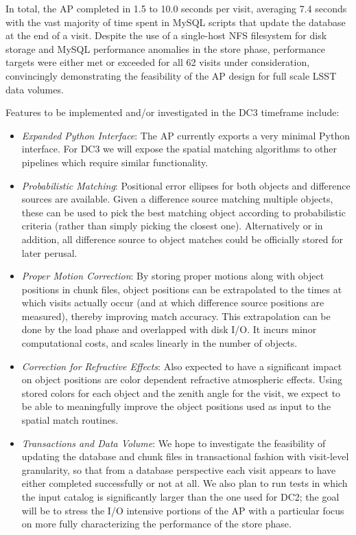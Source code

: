 In total, the AP completed in 1.5 to 10.0 seconds per visit, averaging 7.4
seconds with the vast majority of time spent in MySQL scripts that update the
database at the end of a visit. Despite the use of a single-host NFS
filesystem for disk storage and MySQL performance anomalies in the store
phase, performance targets were either met or exceeded for all 62 visits
under consideration, convincingly demonstrating the feasibility of the AP
design for full scale LSST data volumes.

Features to be implemented and/or investigated in the DC3 timeframe include:
\begin{itemize}
\item \emph{Expanded Python Interface}:
    The AP currently exports a very minimal Python interface. For DC3 we
    will expose the spatial matching algorithms to other pipelines which
    require similar functionality.
\item \emph{Probabilistic Matching}:
    Positional error ellipses for both objects and difference sources are
    available. Given a difference source matching multiple objects, these
    can be used to pick the best matching object according to probabilistic
    criteria (rather than simply picking the closest one). Alternatively
    or in addition, all difference source to object matches could be
    officially stored for later perusal.
\item \emph{Proper Motion Correction}:
    By storing proper motions along with object positions in chunk files,
    object positions can be extrapolated to the times at which visits actually
    occur (and at which difference source positions are measured), thereby
    improving match accuracy. This extrapolation can be done by the load phase
    and overlapped with disk I/O. It incurs minor computational costs, and scales
    linearly in the number of objects.
\item \emph{Correction for Refractive Effects}:
    Also expected to have a significant impact on object positions are
    color dependent refractive atmospheric effects. Using stored
    colors for each object and the zenith angle for the visit, we expect
    to be able to meaningfully improve the object positions used as input to
    the spatial match routines.
\item \emph{Transactions and Data Volume}:
    We hope to investigate the feasibility of updating the database and chunk
    files in transactional fashion with visit-level granularity, so that from
    a database perspective each visit appears to have either completed
    successfully or not at all. We also plan to run tests in which the input
     catalog is significantly larger than the one used for DC2;
    the goal will be to stress the I/O intensive portions of the AP with a
    particular focus on more fully characterizing the performance of the
    store phase.
\end{itemize}

